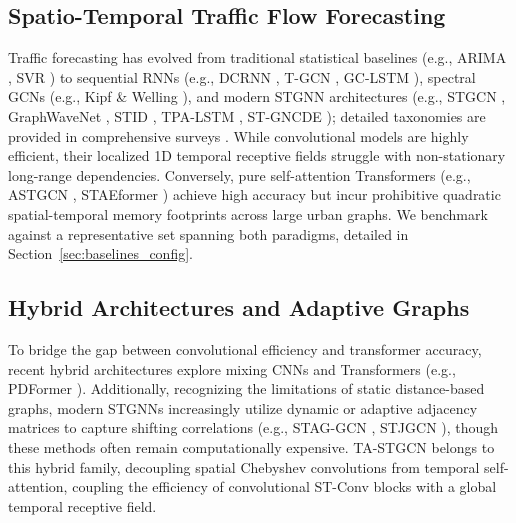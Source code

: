 \documentclass[preprint,12pt]{elsarticle}
\begin{document}
\subsection{Spatio-Temporal Traffic Flow Forecasting}
\label{sec:related_forecasting}
Traffic forecasting has evolved from traditional statistical baselines (e.g., ARIMA \citep{arima}, SVR \citep{svr}) to sequential RNNs (e.g., DCRNN \citep{dcrnn}, T-GCN \citep{tgcn}, GC-LSTM \citep{gclstm}), spectral GCNs (e.g., Kipf \& Welling \citep{gcn}), and modern STGNN architectures (e.g., STGCN \citep{stgcn}, GraphWaveNet \citep{wavenet}, STID \citep{stid}, TPA-LSTM \citep{tpalstm}, ST-GNCDE \citep{stgncde}); detailed taxonomies are provided in comprehensive surveys \citep{yin_survey, gnn_survey}. While convolutional models are highly efficient, their localized 1D temporal receptive fields struggle with non-stationary long-range dependencies. Conversely, pure self-attention Transformers (e.g., ASTGCN \citep{astgcn}, STAEformer \citep{staeformer}) achieve high accuracy but incur prohibitive quadratic spatial-temporal memory footprints across large urban graphs. We benchmark against a representative set spanning both paradigms, detailed in Section~\ref{sec:baselines_config}.

\subsection{Hybrid Architectures and Adaptive Graphs}
\label{sec:related_hybrid}
To bridge the gap between convolutional efficiency and transformer accuracy, recent hybrid architectures explore mixing CNNs and Transformers (e.g., PDFormer \citep{pdformer}). Additionally, recognizing the limitations of static distance-based graphs, modern STGNNs increasingly utilize dynamic or adaptive adjacency matrices to capture shifting correlations (e.g., STAG-GCN \citep{staggcn}, STJGCN \citep{stjgcn}), though these methods often remain computationally expensive. TA-STGCN belongs to this hybrid family, decoupling spatial Chebyshev convolutions from temporal self-attention, coupling the efficiency of convolutional ST-Conv blocks with a global temporal receptive field.
\end{document}
